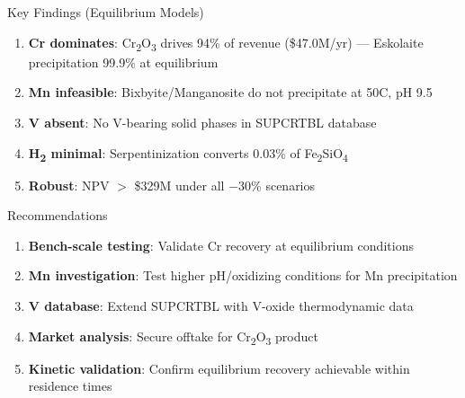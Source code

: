 \documentclass[aspectratio=169]{beamer}
\begin{document}
\begin{frame}{Key Findings (Equilibrium Models)}
\begin{enumerate}
\item \textbf{Cr dominates}: Cr\textsubscript{2}O\textsubscript{3}
      drives 94\% of revenue (\$47.0M/yr) --- Eskolaite precipitation 99.9\% at equilibrium
\item \textbf{Mn infeasible}: Bixbyite/Manganosite do not precipitate at 50\textdegree C, pH 9.5
\item \textbf{V absent}: No V-bearing solid phases in SUPCRTBL database
\item \textbf{H\textsubscript{2} minimal}: Serpentinization converts 0.03\% of Fe\textsubscript{2}SiO\textsubscript{4}
\item \textbf{Robust}: NPV $>$ \$329M under all $-$30\% scenarios
\end{enumerate}
\end{frame}

\begin{frame}{Recommendations}
\begin{enumerate}
\item \textbf{Bench-scale testing}: Validate Cr recovery at equilibrium conditions
\item \textbf{Mn investigation}: Test higher pH/oxidizing conditions for Mn precipitation
\item \textbf{V database}: Extend SUPCRTBL with V-oxide thermodynamic data
\item \textbf{Market analysis}: Secure offtake for Cr\textsubscript{2}O\textsubscript{3} product
\item \textbf{Kinetic validation}: Confirm equilibrium recovery achievable within residence times
\end{enumerate}
\end{frame}

\closingSlide
\end{document}
